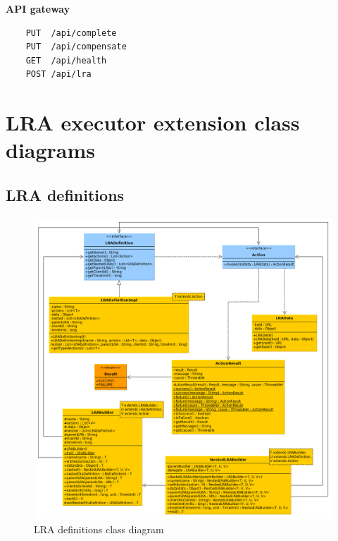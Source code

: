 \documentclass[oneside,
  digital, %
  table,   %
  lof,     %
  lot,     %
]{fithesis3}
\begin{document}
\noindent
\textbf{API gateway}

\begin{verbatim}
    PUT  /api/complete
    PUT  /api/compensate
    GET  /api/health
    POST /api/lra
\end{verbatim}


\clearpage
\chapter{LRA executor extension class diagrams}
\label{sec:appendix-class-diagrams}

\section{LRA definitions}

\hfill \break

\begin{figure}[h]
    \begin{center}
       \includegraphics[trim=4cm 0 -2cm 4cm,width=1.1\textwidth]{images/classDiagrams/lra-definitions.png}
    \end{center}
    \caption{LRA definitions class diagram}
    \label{fig:lra-definition-class-diagram}
\end{figure}

\clearpage
\end{document}
